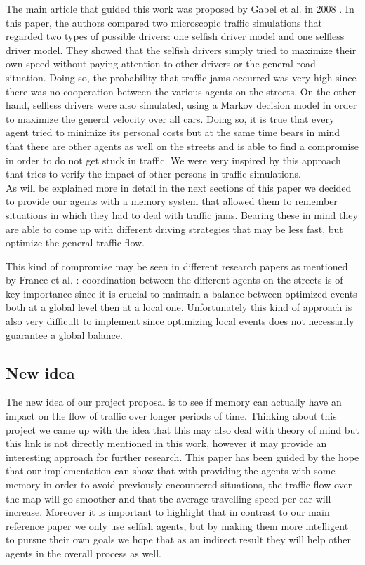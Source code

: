 \documentclass[a4paper,hidelinks]{article}
\begin{document}
The main article that guided this work was proposed by Gabel et al. in 2008 \cite{gabel2012cooperative}. In this paper, the authors compared two microscopic traffic simulations that regarded two types of possible drivers: one selfish driver model and one selfless driver model. They showed that the selfish drivers simply tried to maximize their own speed without paying attention to other drivers or the general road situation. Doing so, the probability that traffic jams occurred was very high since there was no cooperation between the various agents on the streets. On the other hand, selfless drivers were also simulated, using a Markov decision model in order to maximize the general velocity over all cars. Doing so, it is true that every agent tried to minimize its personal costs but at the same time bears in mind that there are other agents as well on the streets and is able to find a compromise in order to do not get stuck in traffic. We were very inspired by this approach that tries to verify the impact of other persons in traffic simulations. \\
As will be explained more in detail in the next sections of this paper we decided to provide our agents with a memory system that allowed them to remember situations in which they had to deal with traffic jams. Bearing these in mind they are able to come up with different driving strategies that may be less fast, but optimize the general traffic flow.

This kind of compromise may be seen in different research papers as mentioned by France et al. \cite{france2003multiagent}: coordination between the different agents on the streets is of key importance since it is crucial to maintain a balance between optimized events both at a global level then at a local one. Unfortunately this kind of approach is also very difficult to implement since optimizing local events does not necessarily guarantee a global balance.         

\subsection{New idea}
The new idea of our project proposal is to see if memory can actually have an impact on the flow of traffic over longer periods of time. Thinking about this project we came up with the idea that this may also deal with theory of mind but this link is not directly mentioned in this work, however it may provide an interesting approach for further research. This paper has been guided by the hope that our implementation can show that with providing the agents with some memory in order to avoid previously encountered situations, the traffic flow over the map will go smoother and that the average travelling speed per car will increase. Moreover it is important to highlight that in contrast to our main reference paper \cite{gabel2012cooperative} we only use selfish agents, but by making them more intelligent to pursue their own goals we hope that as an indirect result they will help other agents in the overall process as well.
\end{document}
